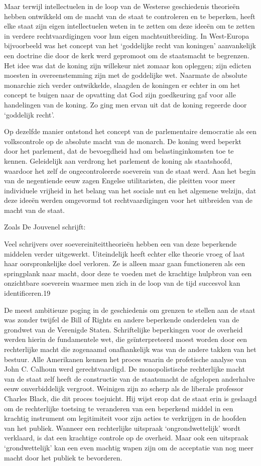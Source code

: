 \documentclass[
  a5paper,
  smalldemyvopaper,10pt,twoside,onecolumn,openright,extrafontsizes,hidelinks]{memoir}
\begin{document}
Maar terwijl intellectuelen in de loop van de Westerse geschiedenis
theorieën hebben ontwikkeld om de macht van de staat te controleren en
te beperken, heeft elke staat zijn eigen intellectuelen weten in te
zetten om deze ideeën om te zetten in verdere rechtvaardigingen voor hun
eigen machtsuitbreiding. In West-Europa bijvoorbeeld was het concept van
het `goddelijke recht van koningen' aanvankelijk een doctrine die door
de kerk werd gepromoot om de staatsmacht te begrenzen. Het idee was dat
de koning zijn willekeur niet zomaar kon opleggen; zijn edicten moesten
in overeenstemming zijn met de goddelijke wet. Naarmate de absolute
monarchie zich verder ontwikkelde, slaagden de koningen er echter in om
het concept te buigen naar de opvatting dat God zijn goedkeuring gaf
voor alle handelingen van de koning. Zo ging men ervan uit dat de koning
regeerde door `goddelijk recht'.

Op dezelfde manier ontstond het concept van de parlementaire democratie
als een volkscontrole op de absolute macht van de monarch. De koning
werd beperkt door het parlement, dat de bevoegdheid had om
belastinginkomsten toe te kennen. Geleidelijk aan verdrong het parlement
de koning als staatshoofd, waardoor het zelf de ongecontroleerde
soeverein van de staat werd. Aan het begin van de negentiende eeuw zagen
Engelse utilitaristen, die pleitten voor meer individuele vrijheid in
het belang van het sociale nut en het algemene welzijn, dat deze ideeën
werden omgevormd tot rechtvaardigingen voor het uitbreiden van de macht
van de staat.

Zoals De Jouvenel schrijft:

Veel schrijvers over soevereiniteittheorieën hebben een van deze
beperkende middelen verder uitgewerkt. Uiteindelijk heeft echter elke
theorie vroeg of laat haar oorspronkelijke doel verloren. Ze is alleen
maar gaan functioneren als een springplank naar macht, door deze te
voeden met de krachtige hulpbron van een onzichtbare soeverein waarmee
men zich in de loop van de tijd succesvol kan identificeren.19

De meest ambitieuze poging in de geschiedenis om grenzen te stellen aan
de staat was zonder twijfel de Bill of Rights en andere beperkende
onderdelen van de grondwet van de Verenigde Staten. Schriftelijke
beperkingen voor de overheid werden hierin de fundamentele wet, die
geïnterpreteerd moest worden door een rechterlijke macht die zogenaamd
onafhankelijk was van de andere takken van het bestuur. Alle Amerikanen
kennen het proces waarin de profetische analyse van John C. Calhoun werd
gerechtvaardigd. De monopolistische rechterlijke macht van de staat zelf
heeft de constructie van de staatsmacht de afgelopen anderhalve eeuw
onverbiddelijk vergroot. Weinigen zijn zo scherp als de liberale
professor Charles Black, die dit proces toejuicht. Hij wijst erop dat de
staat erin is geslaagd om de rechterlijke toetsing te veranderen van een
beperkend middel in een krachtig instrument om legitimiteit voor zijn
acties te verkrijgen in de hoofden van het publiek. Wanneer een
rechterlijke uitspraak `ongrondwettelijk' wordt verklaard, is dat een
krachtige controle op de overheid. Maar ook een uitspraak
`grondwettelijk' kan een even machtig wapen zijn om de acceptatie van
nog meer macht door het publiek te bevorderen.
\end{document}
